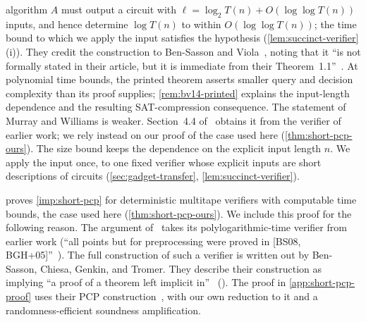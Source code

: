 \documentclass[11pt,letterpaper]{article}
\theoremstyle{definition}
\theoremstyle{remark}
\begin{document}
algorithm \(A\) must output a circuit with
\(\ell=\log_2T(n)+O(\log\log T(n))\) inputs, and hence determine
\(\log T(n)\) to within \(O(\log\log T(n))\); the time
bound to which we apply the input satisfies the hypothesis
(\cref{lem:succinct-verifier}(i)). They credit the
construction to Ben-Sasson and Viola~\cite{BV14}, noting that it ``is
not formally stated in their article, but it is immediate from their
Theorem~1.1''~\cite[footnote~5]{MW20}. At polynomial time bounds,
the printed theorem asserts smaller query and decision complexity
than its proof supplies; \cref{rem:bv14-printed} explains the
input-length dependence and the resulting SAT-compression consequence.
The statement of Murray and Williams is
weaker. Section~4.4 of~\cite{BV14} obtains it from the verifier of
earlier work; we rely instead on our
proof of the case used here (\cref{thm:short-pcp-ours}).
The size bound keeps the dependence on the explicit input length \(n\).
We apply the input once, to one fixed verifier whose explicit inputs are
short descriptions of circuits (\cref{sec:gadget-transfer},
\cref{lem:succinct-verifier}).

 proves \cref{imp:short-pcp} for
deterministic multitape verifiers with computable time bounds, the case
used here (\cref{thm:short-pcp-ours}). We include this proof for the
following reason. The argument of~\cite[Section~4]{BV14} takes its
polylogarithmic-time verifier from earlier work (``all points but for
preprocessing were proved in [BS08, BGH+05]''~\cite[Section~4.2]{BV14}).
The full construction of such a verifier is written out by Ben-Sasson,
Chiesa, Genkin, and Tromer. They describe their construction as
implying ``a proof of a theorem left implicit in''~\cite{BGHSV05}
(\cite[Remark~8.9]{BCGT13}). The proof in \cref{app:short-pcp-proof}
uses their PCP construction~\cite{BCGT13}, with our own reduction to
it and a randomness-efficient soundness amplification.
\end{document}
